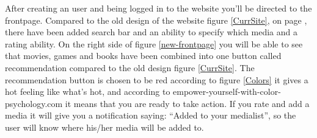 After creating an user and being logged in to the website you’ll be directed to the frontpage. Compared to the old design of the website figure \ref{CurrSite}, on page \pageref{CurrSite}, there have been added search bar and an ability to specify which media and a rating ability. On the right side of figure \ref{new-frontpage} you will be able to see that movies, games and books have been combined into one button called recommendation compared to the old design figure \ref{CurrSite}. The recommendation button is chosen to be red according to figure \ref{Colors} it gives a hot feeling like what’s hot, and according to empower-yourself-with-color-psychology.com it means that you are ready to take action. 
If you rate and add a media it will give you a notification saying: “Added to your medialist”, so the user will know where his/her media will be added to.

